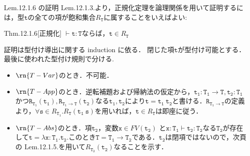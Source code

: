 \documentclass[9pt]{beamer}
\begin{document}
\begin{frame}{Lem.12.1.6 の証明}
Lem.12.1.3.より，正規化定理を論理関係を用いて証明するには，型$\mathtt{t}$の全ての項が飽和集合$R_{\mathtt{T}}$に属することをいえばよい:
\begin{alertblock}{Thm.12.1.6[正規化]}
$\vdash\mathtt{t:T}$ならば，$\mathtt{t}\in R_{\mathtt{T}}$
\end{alertblock}証明は型付け導出に関する induction に依る．
閉じた項$\mathtt{t}$が型付け可能とする．最後に使われた型付け規則で分ける.
\begin{itemize}
\item $\rn{T-Var}$のとき．不可能．
\item $\rn{T-App}$のとき．逆転補題および帰納法の仮定から，$\mathtt{t_{1}:T_{1}\to T, t_{2}:T_{1}}$かつ$\mathtt{R_{\mathtt{T_{1}}}(t_{1}), R_{\mathtt{T_{1}\to T}}(t_{2})}$なる$\mathtt{t_{1}, t_{2}}$により$\mathtt{t = t_{1}\ t_{2}}$と書ける．$\mathtt{R_{\mathtt{T_{1}\to T}}}$の定義より，$\forall\mathtt{s}\in R_{\mathtt{T_{1}}}.R_{\mathtt{T}}(\mathtt{t_{1}\ s})$を用いれば，$\mathtt{t}\in R_{\mathtt{T}}$は即座に従う．
\item $\rn{T-Abs}$のとき．項$\mathtt{t_{2}}$，変数$\mathtt{x}\in FV(\mathtt{t_{2}})$
と$\mathtt{x:T_{1}}\vdash \mathtt{t_{2}:T_{2}}$なる$\mathtt{T_{2}}$が存在して$\mathtt{t = \lambda x:T_{1}.t_{2}}$.このとき$\mathtt{T= T_{1}\to T_{2}}$である．$\mathtt{t_{2}}$は閉項ではないので，次頁の Lem.12.1.5.を用いて$R_{\mathtt{T_{2}}}(\mathtt{t_{2}})$なることを示す．
\end{itemize}
\end{frame}
\end{document}
